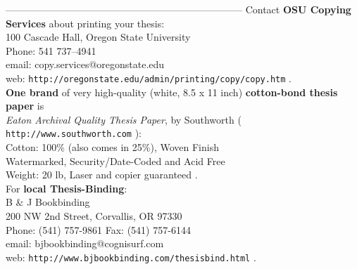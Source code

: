 \documentclass[11pt]{gthesis2}  %
\begin{document}
%
------------------------------------------------------------------------
%
Contact \textbf{OSU Copying Services} about printing your thesis:
\\[.1cm]
%
100 Cascade Hall, Oregon State University\\
Phone: 541 737--4941\\
email: copy.services@oregonstate.edu\\
web: \texttt{http://oregonstate.edu/admin/printing/copy/copy.htm}
.
%
\\[.5cm]
%
\textbf{One brand} of very high-quality (white, 8.5 x 11 inch)
\textbf{cotton-bond thesis paper} is
\\\emph{Eaton Archival Quality Thesis Paper}, by Southworth (
\texttt{http://www.southworth.com} ):
\\[.2cm]
Cotton: 100\% (also comes in 25\%), Woven Finish\\
Watermarked, Security/Date-Coded and Acid Free \\
Weight: 20 lb, Laser and copier guaranteed .
%
\\[.5cm]
%
For \textbf{local Thesis-Binding}: \\[.1cm]
B \& J Bookbinding\\
200 NW 2nd Street, Corvallis, OR 97330\\
 Phone: (541)
757-9861  Fax: (541) 757-6144\\
email: bjbookbinding@cognisurf.com\\
web: \texttt{http://www.bjbookbinding.com/thesisbind.html} .
%
%
%
\newpage%
%
\end{document}
